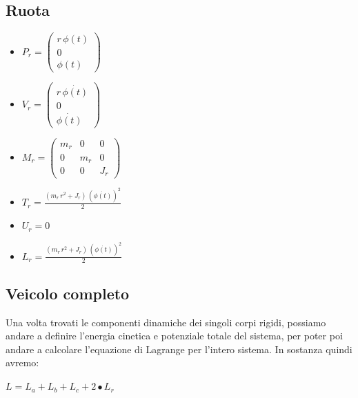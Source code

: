 \subsection{Ruota}
\begin{itemize}
	\item \textbf{$P_r = \left(\begin{array}{c}
		r\,\phi \left(t\right)\\
		0\\
		\phi \left(t\right)
		\end{array}\right)$}
	
	\item \textbf{$V_r = \left(\begin{array}{c}
		r\,\dot{\phi \left(t\right)}\\
		0\\
		\dot{\phi \left(t\right)}
		\end{array}\right)$}
	
	\item \textbf{$M_r = \left(\begin{array}{ccc}
		m_r  & 0 & 0\\
		0 & m_r  & 0\\
		0 & 0 & J_r 
		\end{array}\right)$} \label{matrix:mr}
	
	\item \textbf{$T_r = \frac{{\left(m_r \,r^2 +J_r \right)}\,{{\left(\dot{\phi \left(t\right)}\right)}}^2 }{2}$}
	
	\item \textbf{$U_r = 0$}
	
	\item \textbf{$L_r = \frac{{\left(m_r \,r^2 +J_r \right)}\,{{\left(\dot{\phi \left(t\right)}\right)}}^2 }{2}$}
\end{itemize}

\subsection{Veicolo completo}
Una volta trovati le componenti dinamiche dei singoli corpi rigidi, possiamo andare a definire l'energia cinetica e potenziale totale del sistema, per poter poi andare a calcolare l'equazione di Lagrange per l'intero sistema.
In sostanza quindi avremo:
\begin{center}
	$L = L_a + L_b + L_c + 2 \bullet L_r$
\end{center}

